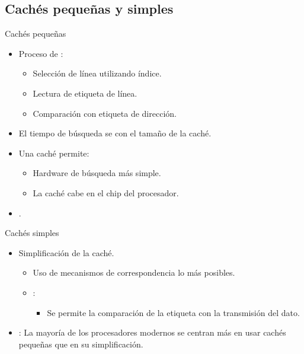 \subsection{Cachés pequeñas y simples}

\begin{frame}[t]{Cachés pequeñas}
\begin{itemize}
  \item Proceso de :
    \begin{itemize}
      \item Selección de línea utilizando índice.
      \item Lectura de etiqueta de línea.
      \item Comparación con etiqueta de dirección.
    \end{itemize}

  \item El tiempo de búsqueda se  con 
        el tamaño de la caché.
  
  \item Una caché  permite:
    \begin{itemize}
      \item Hardware de búsqueda más simple.
      \item La caché cabe en el chip del procesador.
    \end{itemize}

  \item {}.
\end{itemize}
\end{frame}

\begin{frame}[t]{Cachés simples}
\begin{itemize}
  \item Simplificación de la caché.
    \begin{itemize}
      \item Uso de mecanismos de correspondencia lo más  posibles.
      \item {}:
        \begin{itemize}
          \item Se permite  la comparación de 
                la etiqueta con la transmisión del dato.
        \end{itemize}
    \end{itemize}

  \item {}:
        La mayoría de los procesadores modernos se centran más 
        en usar cachés pequeñas que en su simplificación.
\end{itemize}
\end{frame}

